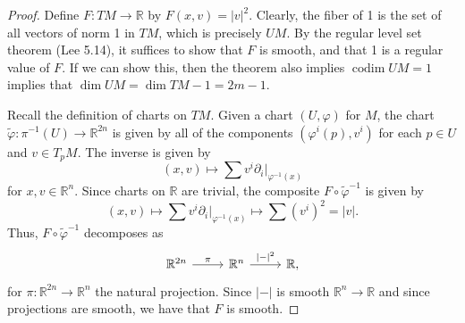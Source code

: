 \documentclass[11pt, letterpaper]{article}
\theoremstyle{plain}
\begin{document}
\begin{proof}
	Define $F : TM \to \mathbb{R} $ by $F(x,v)=\left| v \right| ^2$. Clearly, the fiber of 1 is the set of all vectors of norm 1 in $TM$, which is precisely $UM$. By the regular level set theorem (Lee 5.14), it suffices to show that $F$ is smooth, and that 1 is a regular value of $F$.  If we can show this, then the theorem also implies $\operatorname{codim} UM=1$ implies that $\dim UM=\dim TM-1=2m-1$.

	Recall the definition of charts on $TM$. Given a chart $(U,\varphi )$ for $M$, the chart $\widetilde{\varphi } : \pi ^{-1} (U) \to \mathbb{R} ^{2n} $ is given by all of the components $(\varphi^i(p),v^i)$ for each $p\in U$ and $v\in T_pM$. The inverse is given by
	\[
		(x,v)\mapsto \sum v^i \partial_i|_{\varphi ^{-1} (x)} 
	\]
	for $x,v\in\mathbb{R} ^n$. Since charts on $\mathbb{R} $ are trivial, the composite $F\circ \widetilde{\varphi } ^{-1} $ is given by
	\[
		(x,v)\mapsto \sum v^i \partial _i|_{\varphi ^{-1} (x)} \mapsto \sum (v^i)^2 = \left| v \right| 
	.\]
	Thus, $F\circ \widetilde{\varphi } ^{-1} $ decomposes as
	\[\begin{tikzcd}[row sep = 2.5em, column sep = 2.5em]
	\mathbb{R} ^{2n} \ar[" \pi  ", r]  & \mathbb{R} ^n \ar[" \left| - \right|^2  ", r]  & \mathbb{R} ,
	\end{tikzcd}\]
	for $\pi : \mathbb{R} ^{2n}  \to \mathbb{R} ^n$ the natural projection. Since $\left| - \right| $ is smooth $\mathbb{R} ^n\to \mathbb{R} $ and since projections are smooth, we have that $F$ is smooth.
	

\end{proof}
\end{document}

